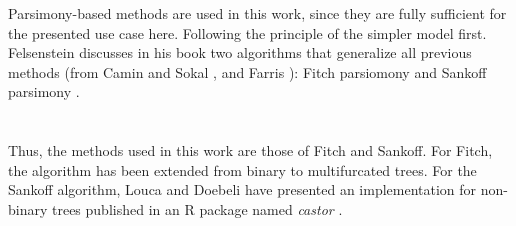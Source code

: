       Parsimony-based methods are used in this work, since they are fully sufficient for the presented 
        use case here. Following the principle of the simpler model first. \\
      Felsenstein \cite{Felsenstein2003} discusses in his book two algorithms that generalize all 
        previous methods (from Camin and Sokal \cite{Camin1965},  and Farris 
        \cite{Farris1970}): Fitch parsiomony \cite{Fitch1971} and Sankoff parsimony \cite{Sankoff1975}. \\
       \\
       \\
      
      Thus, the methods used in this work are those of Fitch and Sankoff. For Fitch, the algorithm has 
        been extended from binary to multifurcated trees. For the Sankoff algorithm, Louca and Doebeli 
        have presented an implementation for non-binary trees published in an R package named 
        \textit{castor} \cite{Louca2017}.

